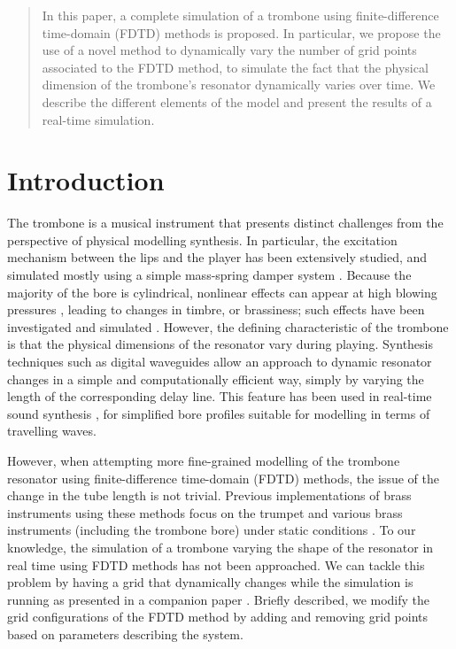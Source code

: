 \begin{abstract}
In this paper, a complete simulation of a trombone using finite-difference time-domain (FDTD) methods is proposed. In particular, we propose the use of a novel method to dynamically vary the number of grid points associated to the FDTD method, to simulate the fact that the physical dimension of the trombone's resonator dynamically varies over time.
We describe the different elements of the model and present the results of a real-time simulation.
\end{abstract}

\section{Introduction}\label{sec:introduction}

The trombone is a musical instrument that presents distinct challenges from the perspective of physical modelling synthesis.
In particular, the excitation mechanism between the lips and the player has been extensively studied, and simulated mostly using a simple mass-spring damper system \cite{campbell2004brass}.
Because the majority of the bore is cylindrical, nonlinear effects can appear at high blowing pressures \cite{Hirschberg96}, leading to changes in timbre, or brassiness; such effects have been investigated and simulated
\cite{campbell2004brass, msallam1997physical,msallam2000physical}.
However, the defining characteristic of the trombone is that the physical dimensions of the resonator vary during playing.
Synthesis techniques such as digital waveguides allow an approach to dynamic resonator changes in a simple and computationally efficient way, simply by varying the length of the corresponding delay line. This feature has been used in real-time sound synthesis \cite{cook2002real}, for simplified bore profiles suitable for modelling in terms of travelling waves.

However, when attempting more fine-grained modelling of the trombone resonator using finite-difference time-domain (FDTD) methods, the issue of the change in the tube length is not trivial. Previous implementations of brass instruments using these methods focus on the trumpet \cite{harrison2015environment} and various brass instruments (including the trombone bore) under static conditions \cite{Bilbao2013}. To our knowledge, the simulation of a trombone varying the shape of the resonator in real time using FDTD methods has not been approached.
We can tackle this problem by having a grid that dynamically changes while the simulation is running as presented in a companion paper \cite{Willemsen2021}. Briefly described, we modify the grid configurations of the FDTD method by adding and removing grid points based on parameters describing the system. 

